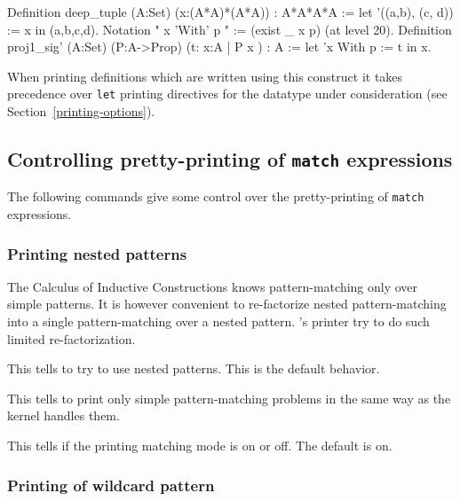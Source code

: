 \begin{coq_example}
Definition deep_tuple (A:Set) (x:(A*A)*(A*A)) : A*A*A*A :=
  let '((a,b), (c, d)) := x in (a,b,c,d).
Notation " x 'With' p " := (exist _ x p) (at level 20).
Definition proj1_sig' (A:Set) (P:A->Prop) (t:{ x:A | P x }) : A :=
  let 'x With p := t in x.
\end{coq_example}

When printing definitions which are written using this construct it
takes precedence over {\tt let} printing directives for the datatype
under consideration (see Section~\ref{printing-options}).

\subsection{Controlling pretty-printing of {\tt match} expressions
\label{printing-options}}

The following commands give some control over the pretty-printing of
{\tt match} expressions.

\subsubsection{Printing nested patterns
\label{SetPrintingMatching}
}

The Calculus of Inductive Constructions knows pattern-matching only
over simple patterns. It is however convenient to re-factorize nested
pattern-matching into a single pattern-matching over a nested pattern.
{\Coq}'s printer try to do such limited re-factorization.

\begin{quote}
{}
\end{quote}
This tells {\Coq} to try to use nested patterns. This is the default
behavior.

\begin{quote}
{}
\end{quote}
This tells {\Coq} to print only simple pattern-matching problems in
the same way as the {\Coq} kernel handles them.

\begin{quote}
{}
\end{quote}
This tells if the printing matching mode is on or off. The default is
on.

\subsubsection{Printing of wildcard pattern
}

